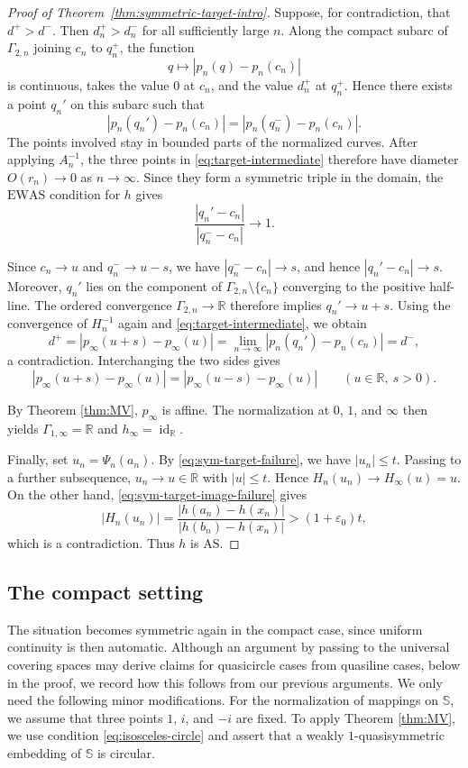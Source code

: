 \documentclass[11pt]{amsart}
\numberwithin{equation}{section}
\theoremstyle{definition} %
\theoremstyle{remarkstyle}
\newcommand{\R}{\mathbb{R}}
\newcommand{\id}{\operatorname{id}}
\begin{document}
\begin{proof}[Proof of Theorem~\ref{thm:symmetric-target-intro}]
Suppose, for contradiction, that $d^+>d^-$.  
Then $d_n^+>d_n^-$ for all sufficiently large $n$.  
Along the compact subarc of $\Gamma_{2,n}$ joining $c_n$ to $q_n^+$, the function
\[
 q\longmapsto |p_n(q)-p_n(c_n)|
\]
is continuous, takes the value $0$ at $c_n$, and the value $d_n^+$ at $q_n^+$.  
Hence there exists a point $q_n'$ on this subarc such that
\begin{equation}\label{eq:target-intermediate}
 |p_n(q_n')-p_n(c_n)|=|p_n(q_n^-)-p_n(c_n)|.
\end{equation}
The points involved stay in bounded parts of the normalized curves.
After applying $A_n^{-1}$, the three points in \eqref{eq:target-intermediate} therefore have diameter $O(r_n)\to0$
as $n \to \infty$.  
Since they form a symmetric  triple in the domain,
the $\mathrm{EWAS}$ condition for $h$ gives
\begin{equation*}
 \frac{|q_n'-c_n|}{|q_n^--c_n|}\to 1.
\end{equation*}

Since $c_n\to u$ and $q_n^-\to u-s$, we have $|q_n^--c_n|\to s$, and hence
$|q_n'-c_n|\to s$.
Moreover, $q_n'$ lies on the component of $\Gamma_{2,n}\setminus\{c_n\}$ converging to the positive half-line.
The ordered convergence $\Gamma_{2,n}\to\R$ therefore implies $q_n'\to  u+s$.
Using the convergence of $H_n^{-1}$ again and \eqref{eq:target-intermediate}, we obtain
\[
 d^+=|p_\infty(u+s)-p_\infty(u)|=\lim_{n\to\infty}|p_n(q_n')-p_n(c_n)|=d^-,
\]
a contradiction.  
Interchanging the two sides gives
\[
 |p_\infty(u+s)-p_\infty(u)|=|p_\infty(u-s)-p_\infty(u)|\qquad (u\in\R,\ s>0).
\]


By Theorem \ref{thm:MV}, $p_\infty$ is affine. 
The normalization at $0$, $1$, and $\infty$ then yields $\Gamma_{1,\infty}=\R$ and $h_\infty=\id_{\R}$.

Finally, set $u_n=\Psi_n(a_n)$.
By \eqref{eq:sym-target-failure}, we have $|u_n|\leq t$.
Passing to a further subsequence, $u_n\to u\in\R$ with $|u|\leq t$.
Hence $H_n(u_n)\to H_\infty(u)=u$.
On the other hand, \eqref{eq:sym-target-image-failure} gives
\[
 |H_n(u_n)|=\frac{|h(a_n)-h(x_n)|}{|h(b_n)-h(x_n)|}>(1+\varepsilon_0)t,
\]
which is  a contradiction.  
Thus $h$ is $\mathrm{AS}$.
\end{proof}

\subsection{The compact setting}

The situation becomes symmetric again in the compact case, since uniform continuity is then automatic.
Although an argument by passing to the universal covering spaces may derive claims for quasicircle cases from quasiline cases, below in the proof, we record how this follows from our previous arguments. 
We only need the following minor modifications.
For the normalization of mappings on $\mathbb S$, we assume that three points $1$, $i$, and $-i$ are fixed. 
To apply Theorem \ref{thm:MV}, we use condition \eqref{eq:isosceles-circle} and assert that a weakly $1$-quasisymmetric embedding of $\mathbb S$ is circular.
\end{document}
